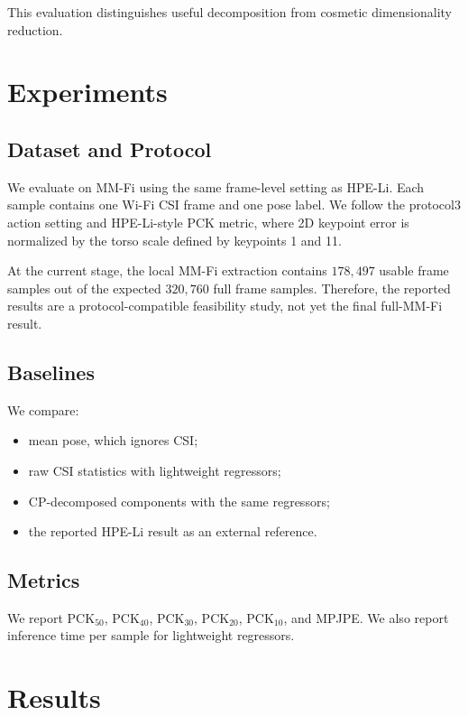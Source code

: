 This evaluation distinguishes useful decomposition from cosmetic dimensionality reduction.

\section{Experiments}

\subsection{Dataset and Protocol}

We evaluate on MM-Fi using the same frame-level setting as HPE-Li. Each sample contains one Wi-Fi CSI frame and one pose label. We follow the protocol3 action setting and HPE-Li-style PCK metric, where 2D keypoint error is normalized by the torso scale defined by keypoints 1 and 11.

At the current stage, the local MM-Fi extraction contains $178{,}497$ usable frame samples out of the expected $320{,}760$ full frame samples. Therefore, the reported results are a protocol-compatible feasibility study, not yet the final full-MM-Fi result.

\subsection{Baselines}

We compare:
\begin{itemize}
    \item mean pose, which ignores CSI;
    \item raw CSI statistics with lightweight regressors;
    \item CP-decomposed components with the same regressors;
    \item the reported HPE-Li result as an external reference.
\end{itemize}

\subsection{Metrics}

We report PCK$_{50}$, PCK$_{40}$, PCK$_{30}$, PCK$_{20}$, PCK$_{10}$, and MPJPE. We also report inference time per sample for lightweight regressors.

\section{Results}

